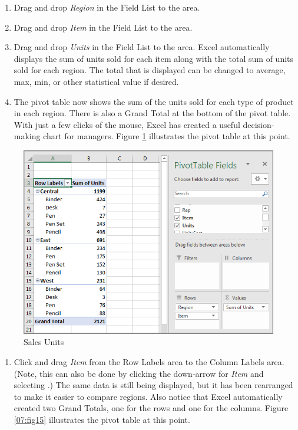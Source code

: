 \begin{enumerate}[resume]
	\item Drag and drop \textit{Region} in the Field List to the  area. 
	\item Drag and drop \textit{Item} in the Field List to the  area.
	\item Drag and drop \textit{Units} in the Field List to the  area. Excel automatically displays the sum of units sold for each item along with the total sum of units sold for each region. The total that is displayed can be changed to average, max, min, or other statistical value if desired. 
	\item The pivot table now shows the sum of the units sold for each type of product in each region. There is also a Grand Total at the bottom of the pivot table. With just a few clicks of the mouse, Excel has created a useful decision-making chart for managers. Figure \ref{07:fig14} illustrates the pivot table at this point.
\end{enumerate}

\begin{figure}[H]
	\centering
	\includegraphics[width=\maxwidth{.95\linewidth}]{gfx/ch07_fig14}
	\caption{Sales Units}
	\label{07:fig14}
\end{figure}
	
\begin{enumerate}[resume]
	\item Click and drag \textit{Item} from the Row Labels area to the Column Labels area. (Note, this can also be done by clicking the down-arrow for \textit{Item} and selecting .) The same data is still being displayed, but it has been rearranged to make it easier to compare regions. Also notice that Excel automatically created two Grand Totals, one for the rows and one for the columns. Figure \ref{07:fig15} illustrates the pivot table at this point.
\end{enumerate}	

